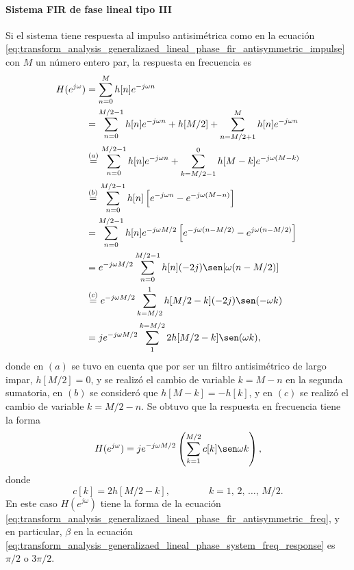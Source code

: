\documentclass[a4paper]{report}
\begin{document}
\paragraph{Sistema FIR de fase lineal tipo III} Si el sistema tiene respuesta al impulso antisimétrica
como en la ecuación \ref{eq:transform_analysis_generalizaed_lineal_phase_fir_antisymmetric_impulse}
con \(M\) un número entero par, la respuesta en frecuencia es
\begin{align*}
 H(e^{j\omega})&=\sum_{n=0}^M h[n]e^{-j\omega n}\\
  &=\sum_{n=0}^{M/2-1}h[n]e^{-j\omega n}+h[M/2]+\sum_{n=M/2+1}^Mh[n]e^{-j\omega n}\\
  &\overset{(a)}{=}\sum_{n=0}^{M/2-1}h[n]e^{-j\omega n}+\sum_{k=M/2-1}^0h[M-k]e^{-j\omega(M-k)}\\
  &\overset{(b)}{=}\sum_{n=0}^{M/2-1}h[n]\left[e^{-j\omega n}-e^{-j\omega(M-n)}\right]\\
  &=\sum_{n=0}^{M/2-1}h[n]e^{-j\omega M/2}\left[e^{-j\omega(n-M/2)}-e^{j\omega(n-M/2)}\right]\\
  &=e^{-j\omega M/2}\sum_{n=0}^{M/2-1}h[n](-2j)\sen[\omega(n-M/2)]\\
  &\overset{(c)}{=}e^{-j\omega M/2}\sum_{k=M/2}^1h[M/2-k](-2j)\sen(-\omega k)\\
  &=je^{-j\omega M/2}\sum_1^{k=M/2} 2h[M/2-k]\sen(\omega k),
\end{align*}
donde en \((a)\) se tuvo en cuenta que por ser un filtro antisimétrico de largo impar, \(h[M/2]=0\), y se realizó el cambio de variable \(k=M-n\) en la segunda sumatoria, en \((b)\) se consideró que \(h[M-k]=-h[k]\), y en \((c)\) se realizó el cambio de variable \(k=M/2-n\). Se obtuvo que la respuesta en frecuencia tiene la forma
\begin{equation}\label{eq:transform_analysis_generalizaed_lineal_phase_fir_type_III_freq_resp}
 H(e^{j\omega})=je^{-j\omega M/2}\left(\sum_{k=1}^{M/2}c[k]\sen\omega k\right), 
\end{equation}
donde
\[
 c[k]=2h[M/2-k],
 \qquad\qquad 
 k=1,\,2,\,\dots,\,M/2.
\]
En este caso \(H(e^{j\omega})\) tiene la forma de la ecuación \ref{eq:transform_analysis_generalizaed_lineal_phase_fir_antisymmetric_freq}, y en particular, \(\beta\) en la ecuación \ref{eq:transform_analysis_generalizaed_lineal_phase_system_freq_response} es \(\pi/2\) o \(3\pi/2\).
\end{document}
